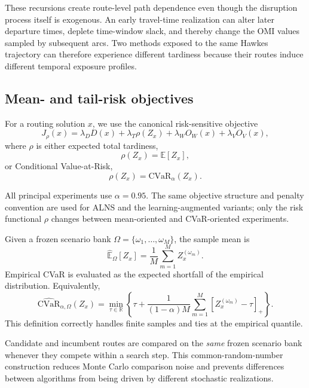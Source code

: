 \documentclass[preprint,12pt]{elsarticle}
\newcommand{\CVaR}{\mathrm{CVaR}}
\newcommand{\1}{\mathbf{1}}
\begin{document}
These recursions create route-level path dependence even though the disruption
process itself is exogenous. An early travel-time realization can alter later
departure times, deplete time-window slack, and thereby change the OMI values
sampled by subsequent arcs. Two methods exposed to the same Hawkes trajectory
can therefore experience different tardiness because their routes induce
different temporal exposure profiles.

\subsection{Mean- and tail-risk objectives}
\label{subsec:risk_objective}

For a routing solution $x$, we use the canonical risk-sensitive objective
\begin{equation}
	J_{\rho}(x)
	=
	\lambda_D D(x)
	+
	\lambda_T \rho(Z_x)
	+
	\lambda_W O_W(x)
	+
	\lambda_V O_V(x),
	\label{eq:canonical_objective}
\end{equation}
where $\rho$ is either expected total tardiness,
\[
\rho(Z_x)=\mathbb{E}[Z_x],
\]
or Conditional Value-at-Risk,
\[
\rho(Z_x)=\CVaR_{\alpha}(Z_x).
\]

All principal experiments use $\alpha=0.95$.
The same objective structure and penalty convention are used for ALNS and the
learning-augmented variants; only the risk functional $\rho$ changes between
mean-oriented and CVaR-oriented experiments.

Given a frozen scenario bank
$\Omega=\{\omega_1,\ldots,\omega_M\}$,
the sample mean is
\begin{equation}
	\widehat{\mathbb{E}}_{\Omega}[Z_x]
	=
	\frac{1}{M}
	\sum_{m=1}^{M}Z_x^{(\omega_m)}.
\end{equation}
Empirical CVaR is evaluated as the expected shortfall of the empirical
distribution. Equivalently,
\begin{equation}
	\widehat{\CVaR}_{\alpha,\Omega}(Z_x)
	=
	\min_{\tau\in\mathbb{R}}
	\left\{
	\tau+
	\frac{1}{(1-\alpha)M}
	\sum_{m=1}^{M}
	\left[
	Z_x^{(\omega_m)}-\tau
	\right]_+
	\right\}.
	\label{eq:empirical_cvar}
\end{equation}
This definition correctly handles finite samples and ties at the empirical
quantile.

Candidate and incumbent routes are compared on the \emph{same} frozen scenario
bank whenever they compete within a search step. This common-random-number
construction reduces Monte Carlo comparison noise and prevents differences
between algorithms from being driven by different stochastic realizations.
\end{document}
